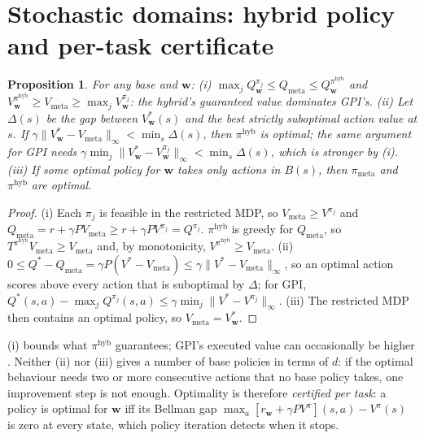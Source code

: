 \documentclass[11pt]{article}
\newcommand{\w}{\mathbf{w}}
\newtheorem{proposition}{Proposition}
\begin{document}
\section{Stochastic domains: hybrid policy and per-task certificate}
\begin{proposition}\label{prop:hyb}
For any base and $\w$: (i) $\max_jQ^{\pi_j}_\w\le Q_{\mathrm{meta}}\le Q^{\pi^{\mathrm{hyb}}}_\w$ and
$V^{\pi^{\mathrm{hyb}}}_\w\ge V_{\mathrm{meta}}\ge\max_jV^{\pi_j}_\w$: the hybrid's guaranteed value dominates GPI's.
(ii) Let $\Delta(s)$ be the gap between $V^*_\w(s)$ and the best strictly suboptimal action value at $s$. If
$\gamma\|V^*_\w-V_{\mathrm{meta}}\|_\infty<\min_s\Delta(s)$, then $\pi^{\mathrm{hyb}}$ is optimal; the same argument for
GPI needs $\gamma\min_j\|V^*_\w-V^{\pi_j}_\w\|_\infty<\min_s\Delta(s)$, which is stronger by (i). (iii) If some optimal
policy for $\w$ takes only actions in $B(s)$, then $\pi_{\mathrm{meta}}$ and $\pi^{\mathrm{hyb}}$ are optimal.
\end{proposition}
\begin{proof}
(i) Each $\pi_j$ is feasible in the restricted MDP, so $V_{\mathrm{meta}}\ge V^{\pi_j}$ and
$Q_{\mathrm{meta}}=r+\gamma PV_{\mathrm{meta}}\ge r+\gamma PV^{\pi_j}=Q^{\pi_j}$. $\pi^{\mathrm{hyb}}$ is greedy for
$Q_{\mathrm{meta}}$, so $T^{\pi^{\mathrm{hyb}}}V_{\mathrm{meta}}\ge V_{\mathrm{meta}}$ and, by monotonicity,
$V^{\pi^{\mathrm{hyb}}}\ge V_{\mathrm{meta}}$. (ii) $0\le Q^*-Q_{\mathrm{meta}}=\gamma P(V^*-V_{\mathrm{meta}})\le
\gamma\|V^*-V_{\mathrm{meta}}\|_\infty$, so an optimal action scores above every action that is suboptimal by $\Delta$;
for GPI, $Q^*(s,a)-\max_jQ^{\pi_j}(s,a)\le\gamma\min_j\|V^*-V^{\pi_j}\|_\infty$. (iii) The restricted MDP then contains
an optimal policy, so $V_{\mathrm{meta}}=V^*_\w$.
\end{proof}
\noindent (i) bounds what $\pi^{\mathrm{hyb}}$ guarantees; GPI's executed value can occasionally be higher
\cite{cog}. Neither (ii) nor (iii) gives a number of base policies in terms of $d$: if the optimal behaviour needs two
or more consecutive actions that no base policy takes, one improvement step is not enough.
Optimality is therefore \emph{certified per task}: a policy is optimal for $\w$ iff its Bellman gap
$\max_a[r_\w+\gamma PV^\pi](s,a)-V^\pi(s)$ is zero at every state, which policy iteration detects when it stops.
\end{document}
